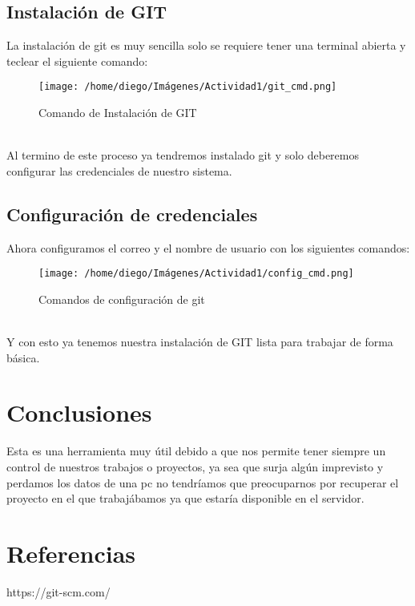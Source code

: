 \documentclass{article}
\begin{document}
		\subsection{Instalación de GIT}
		La instalación de git es muy sencilla solo se requiere tener una terminal abierta y teclear el siguiente comando:
		\begin{figure}[h]
			\centering
			\texttt{[image: /home/diego/Imágenes/Actividad1/git\_cmd.png]}
			\caption{Comando de Instalación de GIT}
		\end{figure}
		\\Al termino de este proceso ya tendremos instalado git y solo deberemos configurar las credenciales de nuestro sistema.
		\subsection{Configuración de credenciales}
		Ahora configuramos el correo y el nombre de usuario con los siguientes comandos:
		\begin{figure}[h]
			\centering
			\texttt{[image: /home/diego/Imágenes/Actividad1/config\_cmd.png]}
			\caption{Comandos de configuración de git}
		\end{figure}
		\\Y con esto ya tenemos nuestra instalación de GIT lista para trabajar de forma básica.
	\section{Conclusiones}
	Esta es una herramienta muy útil debido a que nos permite tener siempre un control de nuestros trabajos o proyectos, ya sea que surja algún imprevisto y perdamos los datos de una pc no tendríamos que preocuparnos por recuperar el proyecto en el que trabajábamos ya que estaría disponible en el servidor.
	\section{Referencias}
	https://git-scm.com/
\end{document}
